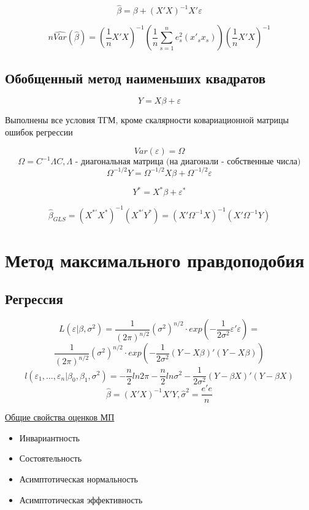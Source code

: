 \documentclass[a4paper, 12pt]{article}
\begin{document}
\[\hat{\beta} = \beta + (X'X)^{-1}X'\varepsilon\]

\[n\hat{Var}(\hat{\beta}) = (\frac{1}{n}X'X)^{-1} (\frac{1}{n}\sum_{s = 1}^{n}e_{s}^{2} (x'_{s}x_{s}))(\frac{1}{n}X'X)^{-1}\]

\subsection{Обобщенный метод наименьших квадратов}

\[Y = X\beta + \varepsilon\]

Выполнены все условия ТГМ, кроме скалярности ковариационной матрицы ошибок регрессии

\[Var(\varepsilon) = \Omega\]
\[\Omega = C^{-1}\Lambda C, \Lambda \textrm{ - диагональная матрица (на диагонали - собственные числа)}\]
\[\Omega^{-1/2}Y = \Omega^{-1/2}X\beta + \Omega^{-1/2}\varepsilon\]

\[Y^{*} = X^{*}\beta + \varepsilon^{*}\]

\[\hat{\beta}_{GLS} = (X^{* \prime}X^{*})^{-1}(X^{*\prime}Y^{*}) = (X'\Omega^{-1} X)^{-1}(X'\Omega^{-1} Y)\]

\section{Метод максимального правдоподобия}

\subsection{Регрессия}

\[L(\varepsilon|\beta, \sigma^{2}) = \frac{1}{(2\pi)^{n/2}}(\sigma^{2})^{n/2} \cdot exp\left(-\frac{1}{2\sigma^{2}}\varepsilon'\varepsilon\right)=\]
\[\frac{1}{(2\pi)^{n/2}}(\sigma^{2})^{n/2} \cdot exp\left(-\frac{1}{2\sigma^{2}}(Y - X\beta)'(Y - X\beta)\right)\]
\[l(\varepsilon_{1}, ..., \varepsilon_{n}|\beta_{0}, \beta_{1}, \sigma^{2}) = -\frac{n}{2}ln2\pi-\frac{n}{2}ln\sigma^{2}-\frac{1}{2\sigma^{2}}(Y - \beta X)'(Y - \beta X)\]
\[\hat{\beta} = (X'X)^{-1}X'Y, \hat{\sigma}^{2} = \frac{e'e}{n}\]


\underline{Общие свойства оценков МП}
\begin{itemize}
    \item Инвариантность
    \item Состоятельность
    \item Асимптотическая нормальность
    \item Асимптотическая эффективность
\end{itemize}
\end{document}
